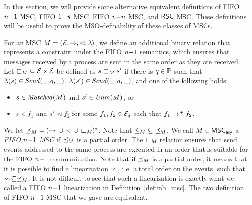 In this section, we will provide some alternative equivalent definitions of FIFO $n\mathsf{-}1$ MSC, FIFO $1\mathsf{-}n$ MSC, FIFO $n\mathsf{-}n$ MSC, and $\mathsf{RSC}$ MSC. These definitions will be useful to prove the MSO-definability of these classes of MSCs.

\begin{definition} \label{def:n_one_alt}
	For an MSC $M = (\mathcal{E},\to,\lhd,\lambda)$, we define
	an additional binary relation that represents a constraint
	under the FIFO $n\mathsf{-}1$ semantics, which ensures that messages received by a process are sent in the same order as they are received.
	Let ${\sqsubset}_M \subseteq \mathcal{E} \times \mathcal{E}$
	be defined as $s \sqsubset_M s'$ if there is $q \in \mathbb{P}$
	such that $\lambda(s) \in {\mathit{Send}(\hspace{0.1em}\underline{\hspace{0.5em}}\hspace{0.1em},q,\hspace{0.1em}\underline{\hspace{0.5em}}\hspace{0.1em})}$,
	$\lambda(s') \in {\mathit{Send}(\hspace{0.1em}\underline{\hspace{0.5em}}\hspace{0.1em},q,\hspace{0.1em}\underline{\hspace{0.5em}}\hspace{0.1em})}$, and one of the following holds:
	\begin{itemize}\itemsep=0.5ex
		\item $s \in \mathit{Matched}(M)$ and $s' \in \mathit{Unm}(M)$, or
		\item $s \lhd f_1$ and $s' \lhd f_2$ for some $f_1,f_2 \in \mathcal{E}_q$ such that $f_1 \to^+ f_2$.
	\end{itemize}
	
	We let ${\preceq_M} = ({\to} \,\cup\, {\lhd} \,\cup\, {\sqsubset_M})^\ast$.
	Note that ${\le_M} \subseteq {\preceq_M}$.
	We call $M \in \mathsf{MSC}_{\mathsf{asy}}$ a \emph{FIFO $n\mathsf{-}1$ MSC}
	if ${\preceq_M}$ is a partial order. The ${\sqsubset}_M$ relation ensures that send events addressed to the same process are executed in an order that is suitable for the FIFO $n\mathsf{-}1$ communication. Note that if ${\preceq_M}$ is a partial order, it means that it is possible to find a linearization $\rightsquigarrow$, i.e. a total order on the events, such that $\rightsquigarrow \subseteq \preceq_M$. It is not difficult to see that such a linearization is exactly what we called a FIFO $n\mathsf{-}1$ linearization in Definition~\ref{def:mb_msc}. The two definition of FIFO $n\mathsf{-}1$ MSC that we gave are equivalent.
\end{definition}
	

